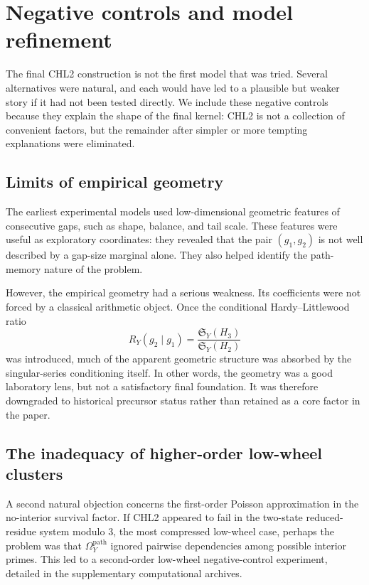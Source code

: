 \documentclass[10pt]{article}
\newcommand{\SY}{\mathfrak{S}_Y}
\begin{document}
\section{Negative controls and model refinement}
The final CHL2 construction is not the first model that was tried.  Several alternatives were natural, and each would have led to a plausible but weaker story if it had not been tested directly.  We include these negative controls because they explain the shape of the final kernel: CHL2 is not a collection of convenient factors, but the remainder after simpler or more tempting explanations were eliminated.

\subsection{Limits of empirical geometry}
The earliest experimental models used low-dimensional geometric features of consecutive gaps, such as shape, balance, and tail scale.  These features were useful as exploratory coordinates: they revealed that the pair $(g_1,g_2)$ is not well described by a gap-size marginal alone.  They also helped identify the path-memory nature of the problem.

However, the empirical geometry had a serious weakness.  Its coefficients were not forced by a classical arithmetic object.  Once the conditional Hardy--Littlewood ratio
\[
R_Y(g_2\mid g_1)=\frac{\SY(H_3)}{\SY(H_2)}
\]
was introduced, much of the apparent geometric structure was absorbed by the singular-series conditioning itself.  In other words, the geometry was a good laboratory lens, but not a satisfactory final foundation.  It was therefore downgraded to historical precursor status rather than retained as a core factor in the paper.

\subsection{The inadequacy of higher-order low-wheel clusters}\label{sec:second_order_control}
A second natural objection concerns the first-order Poisson approximation in the no-interior survival factor.  If CHL2 appeared to fail in the two-state reduced-residue system modulo $3$, the most compressed low-wheel case, perhaps the problem was that $\Omega_Y^{\mathrm{path}}$ ignored pairwise dependencies among possible interior primes.  This led to a second-order low-wheel negative-control experiment, detailed in the supplementary computational archives.
\end{document}
